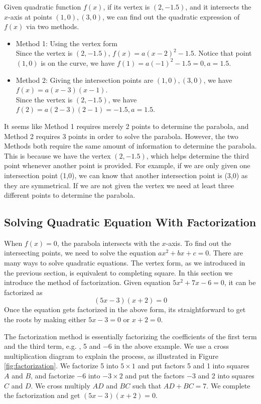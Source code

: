\documentclass[11pt, oneside]{article}   	%
\begin{document}
Given quadratic function $f(x)$, if its vertex is $(2,-1.5)$, and it intersects the $x$-axis at points $(1,0), (3,0)$, 
we can find out the quadratic expression of $f(x)$ via two methods.

\begin{itemize}
\item Method 1: Using the vertex form \\
Since the vertex is $(2,-1.5)$, $f(x)=a(x-2)^2-1.5$. Notice that point $(1,0)$ is on the curve, we have $f(1)=a(-1)^2-1.5 = 0, a=1.5$.
\item Method 2: Giving the intersection points are $(1,0), (3,0)$, we have $f(x)=a(x-3)(x-1)$.\\ Since the vertex is $(2,-1.5)$, we have $f(2)=a(2-3)(2-1)=-1.5, a =1.5$.
\end{itemize}
It seems like Method 1 requires merely 2 points to determine the parabola, and Method 2 requires 3 points in order to solve the parabola. However, the two Methods both require the same amount of information to determine the parabola. This is because we have the vertex $(2,-1.5)$, which helps determine the third point whenever another point is provided. For example, if we are only given one intersection point (1,0), we can know that another intersection point is (3,0) as they are symmetrical. If we are not given the vertex we need at least three different points to determine the parabola.

\subsection{Solving Quadratic Equation With Factorization}
When $f(x)=0$, the parabola intersects with the $x$-axis. To find out the intersecting points, we need to solve the equation $ax^2+bx+c=0$. There are many ways to solve quadratic equations. The vertex form, as we introduced in the previous section, is equivalent to completing square. In this section we introduce the method of factorization.  
Given equation $5x^2 + 7x -6=0$, it can be factorized as 
\[(5x-3)(x+2)=0\]
Once the equation gets factorized in the above form, its straightforward to get the roots by making either $5x-3=0$ or $x+2=0$.

The factorization method is essentially factorizing the coefficients of the first term and the third term, e.g. , 5 and $-6$ in the above example. We use a cross multiplication diagram to explain the process, as illustrated in Figure \ref{fig:factorization}. We factorize 5 into $5\times 1$ and put factors 5 and 1 into squares $A$ and $B$, and factorize $-6$ into $-3\times 2$ and put the factors $-3$ and 2 into squares $C$ and $D$. We cross multiply $AD$ and $BC$ such that $AD+BC=7$. We complete the factorization and get $(5x-3)(x+2)=0$.
\end{document}
